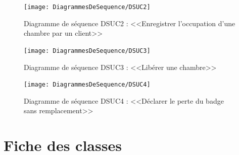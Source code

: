 \documentclass[11pt,article]{article}
\begin{document}
\newpage

\begin{figure}[h!]
  \texttt{[image: DiagrammesDeSequence/DSUC2]}
  \caption{Diagramme de séquence DSUC2 : <<Enregistrer l'occupation d'une chambre par un client>>}
  \label{umlet_diag_seq2}
\end{figure}

\newpage

\begin{figure}[h!]
  \texttt{[image: DiagrammesDeSequence/DSUC3]}
  \caption{Diagramme de séquence DSUC3 : <<Libérer une chambre>>}
  \label{umlet_diag_seq3}
\end{figure}

\newpage

\begin{figure}[h!]
  \texttt{[image: DiagrammesDeSequence/DSUC4]}
  \caption{Diagramme de séquence DSUC4 : <<Déclarer le perte du badge sans remplacement>>}
  \label{umlet_diag_seq4}
\end{figure}
\newpage

\section{Fiche des classes}
\end{document}
